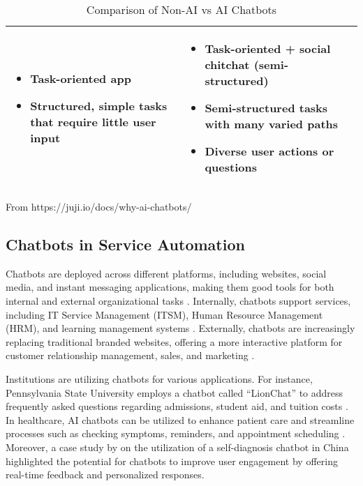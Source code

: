 \begin{table}[ht]
\begin{adjustbox}{max width=\textwidth}
\begin{tabular}{|p{3.3cm}|l|l|}
\begin{minipage}[t]{0.5\textwidth}
				\begin{itemize}
					\item Task-oriented app
					\item Structured, simple tasks that require little user input
				\end{itemize}
			\end{minipage} &
			\begin{minipage}[t]{0.5\textwidth}
				\begin{itemize}
					\item Task-oriented + social chitchat (semi-structured)
					\item Semi-structured tasks with many varied paths
					\item Diverse user actions or questions
				\end{itemize}
			\end{minipage} \\
			\hline
		\end{tabular}
	\end{adjustbox}
	\caption{Comparison of Non-AI vs AI Chatbots}
	From https://juji.io/docs/why-ai-chatbots/
	\label{Tab: chatbot_comparison}
\end{table}

\subsection{Chatbots in Service Automation}
Chatbots are deployed across different platforms, including websites, social media, and instant messaging applications, making them good tools for both internal and external organizational tasks \cite{hagberg2016, zarouali2018}. Internally, chatbots support services, including IT Service Management (ITSM), Human Resource Management (HRM), and learning management systems \cite{nawaz2019, bakouan2018}. Externally, chatbots are increasingly replacing traditional branded websites, offering a more interactive platform for customer relationship management, sales, and marketing \cite{broeck2019}.

Institutions are utilizing chatbots for various applications. For instance, Pennsylvania State University employs a chatbot called “LionChat” to address frequently asked questions regarding admissions, student aid, and tuition costs \cite{Pennstate}. In healthcare, AI chatbots can be utilized to enhance patient care and streamline processes such as checking symptoms, reminders, and appointment scheduling \cite{altamimi2023}. Moreover, a case study by \cite{fan2021} on the utilization of a self-diagnosis chatbot in China highlighted the potential for chatbots to improve user engagement by offering real-time feedback and personalized responses.


